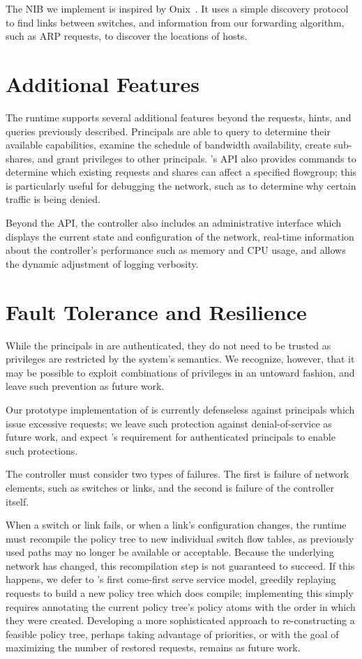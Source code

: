 The NIB we implement is inspired by Onix~\cite{Koponen:2010}. It
uses a simple discovery protocol to find links between switches, and
information from our forwarding algorithm, such as ARP requests, to
discover the locations of hosts. 

\section{Additional Features}

The \sys runtime supports several additional features beyond the
requests, hints, and queries previously described. Principals are
able to query \sys to determine their available capabilities,
examine the schedule of bandwidth availability, create
sub-shares, and grant privileges to other principals.  \sys's API
also provides commands to determine which existing requests and
shares can affect a specified flowgroup; this is particularly useful
for debugging the network, such as to determine why certain traffic
is being denied. 

Beyond the API, the \sys controller also includes an administrative
interface which displays the current state and configuration of the
network, real-time information about the controller's performance
such as memory and CPU usage, and allows the dynamic adjustment of
logging verbosity.

\section{Fault Tolerance and Resilience}
\label{sec:dynamics}

While the principals in \sys are
authenticated, they do not need to be trusted as privileges are
restricted by the system's semantics. We recognize, however, that it
may be possible to exploit combinations of privileges in an untoward
fashion, and leave such prevention as future work.

Our prototype implementation of \sys is currently defenseless against
principals which issue excessive requests; we leave such protection against
denial-of-service as future work, and expect \sys's requirement for
authenticated principals to enable such protections.

The \sys controller must consider two types of failures.  The first is
failure of network elements, such as switches or links, and the
second is failure of the controller itself.

When a switch or link fails, or when a link's configuration changes,
the \sys runtime must recompile the policy tree to new individual
switch flow tables, as previously used paths may no longer be
available or acceptable. Because the underlying network has changed,
this recompilation step is not guaranteed to succeed.  If this
happens, we defer to \sys's first come-first serve service model,
greedily replaying requests to build a new policy tree which
does compile; implementing this simply requires annotating the
current policy tree's policy atoms with the order in which they were
created.  Developing a more sophisticated approach to
re-constructing a feasible policy tree, perhaps taking
advantage of priorities, or with the goal of maximizing the number
of restored requests, remains as future work. 

